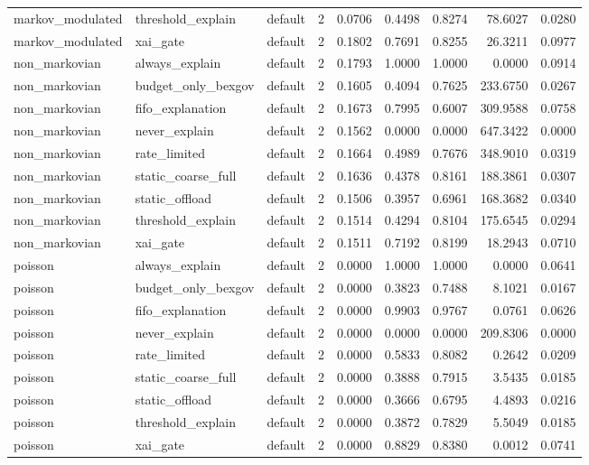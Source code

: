 \begin{table}[t]
\begin{tabular}{lllrrrrrr}
markov\_modulated & threshold\_explain & default & 2 & 0.0706 & 0.4498 & 0.8274 & 78.6027 & 0.0280 \\
markov\_modulated & xai\_gate & default & 2 & 0.1802 & 0.7691 & 0.8255 & 26.3211 & 0.0977 \\
non\_markovian & always\_explain & default & 2 & 0.1793 & 1.0000 & 1.0000 & 0.0000 & 0.0914 \\
non\_markovian & budget\_only\_bexgov & default & 2 & 0.1605 & 0.4094 & 0.7625 & 233.6750 & 0.0267 \\
non\_markovian & fifo\_explanation & default & 2 & 0.1673 & 0.7995 & 0.6007 & 309.9588 & 0.0758 \\
non\_markovian & never\_explain & default & 2 & 0.1562 & 0.0000 & 0.0000 & 647.3422 & 0.0000 \\
non\_markovian & rate\_limited & default & 2 & 0.1664 & 0.4989 & 0.7676 & 348.9010 & 0.0319 \\
non\_markovian & static\_coarse\_full & default & 2 & 0.1636 & 0.4378 & 0.8161 & 188.3861 & 0.0307 \\
non\_markovian & static\_offload & default & 2 & 0.1506 & 0.3957 & 0.6961 & 168.3682 & 0.0340 \\
non\_markovian & threshold\_explain & default & 2 & 0.1514 & 0.4294 & 0.8104 & 175.6545 & 0.0294 \\
non\_markovian & xai\_gate & default & 2 & 0.1511 & 0.7192 & 0.8199 & 18.2943 & 0.0710 \\
poisson & always\_explain & default & 2 & 0.0000 & 1.0000 & 1.0000 & 0.0000 & 0.0641 \\
poisson & budget\_only\_bexgov & default & 2 & 0.0000 & 0.3823 & 0.7488 & 8.1021 & 0.0167 \\
poisson & fifo\_explanation & default & 2 & 0.0000 & 0.9903 & 0.9767 & 0.0761 & 0.0626 \\
poisson & never\_explain & default & 2 & 0.0000 & 0.0000 & 0.0000 & 209.8306 & 0.0000 \\
poisson & rate\_limited & default & 2 & 0.0000 & 0.5833 & 0.8082 & 0.2642 & 0.0209 \\
poisson & static\_coarse\_full & default & 2 & 0.0000 & 0.3888 & 0.7915 & 3.5435 & 0.0185 \\
poisson & static\_offload & default & 2 & 0.0000 & 0.3666 & 0.6795 & 4.4893 & 0.0216 \\
poisson & threshold\_explain & default & 2 & 0.0000 & 0.3872 & 0.7829 & 5.5049 & 0.0185 \\
poisson & xai\_gate & default & 2 & 0.0000 & 0.8829 & 0.8380 & 0.0012 & 0.0741 \\

\end{tabular}
\end{table}
